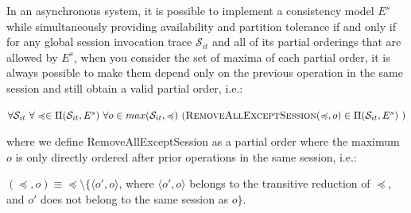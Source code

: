 \documentclass[acmlarge, ,11pt]{acmart}
\begin{document}
\begin{theorem}
In an asynchronous system, it is possible to implement a consistency model $E^s$ while simultaneously providing availability and partition tolerance if and only if for any global session invocation trace $\mathcal{S}_{it}$ and all of its partial orderings that are allowed by $E^s$, when you consider the set of maxima of each partial order, it is always possible to make them depend only on the previous operation in the same session and still obtain a valid partial order, i.e.:


\noindent $\forall \mathcal{S}_{it} ~ \forall \preccurlyeq \in \Pi(\mathcal{S}_{it},E^s) ~ \forall o \in max(\mathcal{S}_{it}, \preccurlyeq) ~ (\textsc{RemoveAllExceptSession}(\preccurlyeq,o) \in \Pi(\mathcal{S}_{it},E^s) ~ ) $

where we define {\sc RemoveAllExceptSession} as a partial order where the maximum $o$ is only directly ordered after prior operations in the same session, i.e.:

$(\preccurlyeq,o) \equiv \preccurlyeq \setminus \{ \langle o',o \rangle$, where $\langle o',o \rangle$ belongs to the transitive reduction of $\preccurlyeq$, and $o'$ does not belong to the same session as $o\}$.



 \end{theorem} \label{thrm:cap}
\end{document}
